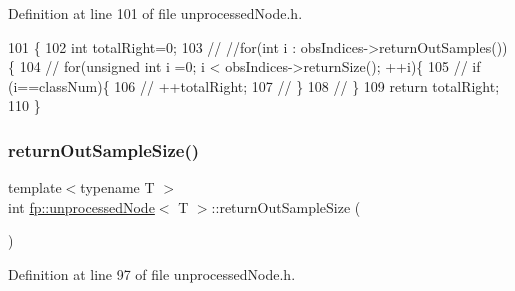 Definition at line 101 of file unprocessed\+Node.\+h.


\begin{DoxyCode}
101                                                              \{
102                     \textcolor{keywordtype}{int} totalRight=0;
103                     \textcolor{comment}{//  //for(int i : obsIndices->returnOutSamples())\{}
104                     \textcolor{comment}{//  for(unsigned int i =0; i <  obsIndices->returnSize(); ++i)\{}
105                     \textcolor{comment}{//      if (i==classNum)\{}
106                     \textcolor{comment}{//      ++totalRight;}
107                     \textcolor{comment}{//      \}}
108                     \textcolor{comment}{//      \}}
109                     \textcolor{keywordflow}{return} totalRight;
110                 \}
\end{DoxyCode}
\mbox{\label{classfp_1_1unprocessedNode_a0ebfd763233eeb60b9ee6a803e2dc917}} 
\subsubsection{\texorpdfstring{return\+Out\+Sample\+Size()}{returnOutSampleSize()}}
{\footnotesize\ttfamily template$<$typename T $>$ \\
int \hyperlink{classfp_1_1unprocessedNode}{fp\+::unprocessed\+Node}$<$ T $>$\+::return\+Out\+Sample\+Size (\begin{DoxyParamCaption}{ }\end{DoxyParamCaption})\hspace{0.3cm}{\ttfamily [inline]}}



Definition at line 97 of file unprocessed\+Node.\+h.


